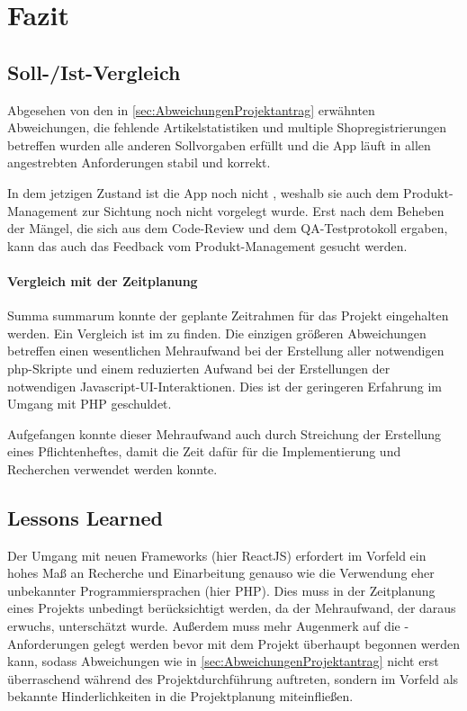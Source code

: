 \section{Fazit} 
\label{sec:Fazit}

\subsection{Soll-/Ist-Vergleich}
\label{sec:SollIstVergleich}

Abgesehen von den in \ref{sec:AbweichungenProjektantrag} erwähnten Abweichungen, die fehlende Artikelstatistiken und multiple Shopregistrierungen betreffen wurden alle anderen Sollvorgaben erfüllt und die App läuft in allen angestrebten Anforderungen stabil und korrekt.

In dem jetzigen Zustand ist die App noch nicht , weshalb sie auch dem Produkt-Management zur Sichtung noch nicht vorgelegt wurde. Erst nach dem Beheben der Mängel, die sich aus dem Code-Review und dem QA-Testprotokoll ergaben, kann das auch das Feedback vom Produkt-Management gesucht werden.

\paragraph{Vergleich mit der Zeitplanung}
Summa summarum konnte der geplante Zeitrahmen für das Projekt eingehalten werden. Ein Vergleich ist im  zu finden. Die einzigen größeren Abweichungen betreffen einen wesentlichen Mehraufwand bei der Erstellung aller notwendigen php-Skripte und einem reduzierten Aufwand bei der Erstellungen der notwendigen Javascript-UI-Interaktionen. Dies ist der geringeren Erfahrung im Umgang mit PHP geschuldet.

Aufgefangen konnte dieser Mehraufwand auch durch Streichung der Erstellung eines Pflichtenheftes, damit die Zeit dafür für die Implementierung und Recherchen verwendet werden konnte.

\subsection{Lessons Learned}
\label{sec:LessonsLearned}

Der Umgang mit neuen Frameworks (hier ReactJS) erfordert im Vorfeld ein hohes Maß an Recherche und Einarbeitung genauso wie die Verwendung eher unbekannter Programmiersprachen (hier PHP). Dies muss in der Zeitplanung eines Projekts unbedingt berücksichtigt werden, da der Mehraufwand, der daraus erwuchs, unterschätzt wurde. Außerdem muss mehr Augenmerk auf die -Anforderungen gelegt werden bevor mit dem Projekt überhaupt begonnen werden kann, sodass Abweichungen wie in \ref{sec:AbweichungenProjektantrag} nicht erst überraschend während des Projektdurchführung auftreten, sondern im Vorfeld als bekannte Hinderlichkeiten in die Projektplanung miteinfließen.

